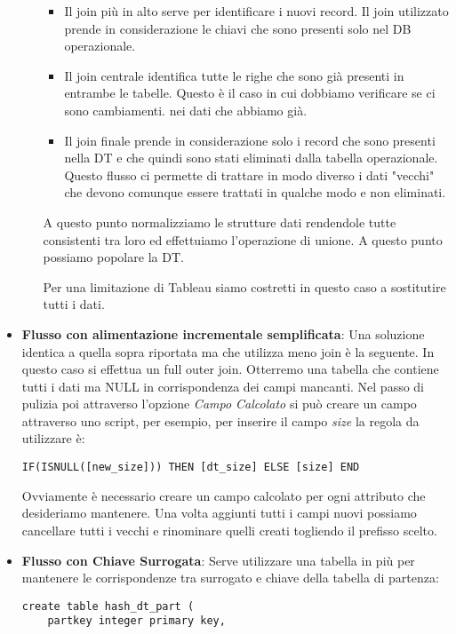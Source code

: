 \begin{itemize}
\begin{itemize}
\begin{itemize}
			\item Il join più in alto serve per identificare i nuovi record. Il join utilizzato prende in considerazione le chiavi che sono presenti solo nel DB operazionale.
			\item Il join centrale identifica tutte le righe che sono già presenti in entrambe le tabelle. Questo è il caso in cui dobbiamo verificare se ci sono cambiamenti. nei dati che abbiamo già.
			\item Il join finale prende in considerazione solo i record che sono presenti nella DT e che quindi sono stati eliminati dalla tabella operazionale. Questo flusso ci permette di trattare in modo diverso i dati "vecchi" che devono comunque essere trattati in qualche modo e non eliminati.
		\end{itemize}
		A questo punto normalizziamo le strutture dati rendendole tutte consistenti tra loro ed effettuiamo l'operazione di unione. A questo punto possiamo popolare la DT.
		\begin{warn}
			Per una limitazione di Tableau siamo costretti in questo caso a sostitutire tutti i dati.
		\end{warn}
	\end{itemize}
	\item \textbf{Flusso con alimentazione incrementale semplificata}:
	Una soluzione identica a quella sopra riportata ma che utilizza meno join è la seguente.
	In questo caso si effettua un full outer join. Otterremo una tabella che contiene tutti i dati ma NULL in corrispondenza dei campi mancanti. Nel passo di pulizia poi attraverso l'opzione \textit{Campo Calcolato} si può creare un campo attraverso uno script, per esempio, per inserire il campo \textit{size} la regola da utilizzare è:
	\begin{verbatim}
IF(ISNULL([new_size])) THEN [dt_size] ELSE [size] END
	\end{verbatim}
	Ovviamente è necessario creare un campo calcolato per ogni attributo che desideriamo mantenere. Una volta aggiunti tutti i campi nuovi possiamo cancellare tutti i vecchi e rinominare quelli creati togliendo il prefisso scelto.
	\item \textbf{Flusso con Chiave Surrogata}:
	Serve utilizzare una tabella in più per mantenere le corrispondenze tra surrogato e chiave della tabella di partenza:
	\begin{verbatim}
create table hash_dt_part (
	partkey integer primary key,

\end{verbatim}
\end{itemize}
